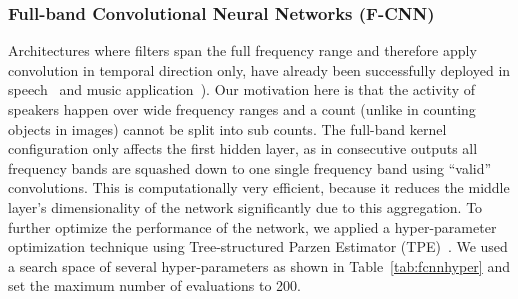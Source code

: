 \subsubsection{Full-band Convolutional Neural Networks (F-CNN)}%
Architectures where filters span the full frequency range and therefore apply convolution in temporal direction only, have already been successfully deployed in speech~\cite{amodei16} and music application~\cite{Choi17, pons16, Dieleman14}).
Our motivation here is that the activity of speakers happen over wide frequency ranges and a count (unlike in counting objects in images) cannot be split into sub counts.
The full-band kernel configuration only affects the first hidden layer, as in consecutive outputs all frequency bands are squashed down to one single frequency band using ``valid'' convolutions.
This is computationally very efficient, because it reduces the middle layer's dimensionality of the network significantly due to this aggregation.
To further optimize the performance of the network, we applied a hyper-parameter optimization technique using Tree-structured Parzen Estimator (TPE)~\cite{bergstra11}.
We used a search space of several hyper-parameters as shown in Table~\ref{tab:fcnnhyper} and set the maximum number of evaluations to 200.

